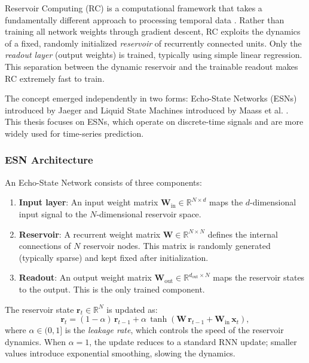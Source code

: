Reservoir Computing (RC) is a computational framework that takes a fundamentally different approach to processing temporal data \cite{lukosevicius2009reservoir, tanaka2019recent}. Rather than training all network weights through gradient descent, RC exploits the dynamics of a fixed, randomly initialized \emph{reservoir} of recurrently connected units. Only the \emph{readout layer} (output weights) is trained, typically using simple linear regression. This separation between the dynamic reservoir and the trainable readout makes RC extremely fast to train.

The concept emerged independently in two forms: Echo-State Networks (ESNs) introduced by Jaeger \cite{jaeger2001echo} and Liquid State Machines introduced by Maass et al. \cite{maass2002real}. This thesis focuses on ESNs, which operate on discrete-time signals and are more widely used for time-series prediction.

\subsubsection{ESN Architecture}

An Echo-State Network consists of three components:

\begin{enumerate}
    \item \textbf{Input layer}: An input weight matrix $\mathbf{W}_{\text{in}} \in \mathbb{R}^{N \times d}$ maps the $d$-dimensional input signal to the $N$-dimensional reservoir space.
    \item \textbf{Reservoir}: A recurrent weight matrix $\mathbf{W} \in \mathbb{R}^{N \times N}$ defines the internal connections of $N$ reservoir nodes. This matrix is randomly generated (typically sparse) and kept fixed after initialization.
    \item \textbf{Readout}: An output weight matrix $\mathbf{W}_{\text{out}} \in \mathbb{R}^{d_{\text{out}} \times N}$ maps the reservoir states to the output. This is the only trained component.
\end{enumerate}

The reservoir state $\mathbf{r}_t \in \mathbb{R}^N$ is updated as:
\begin{equation}
    \mathbf{r}_t = (1 - \alpha) \, \mathbf{r}_{t-1} + \alpha \, \tanh(\mathbf{W} \, \mathbf{r}_{t-1} + \mathbf{W}_{\text{in}} \, \mathbf{x}_t),
    \label{eq:esn_state}
\end{equation}
where $\alpha \in (0, 1]$ is the \emph{leakage rate}, which controls the speed of the reservoir dynamics. When $\alpha = 1$, the update reduces to a standard RNN update; smaller values introduce exponential smoothing, slowing the dynamics.

